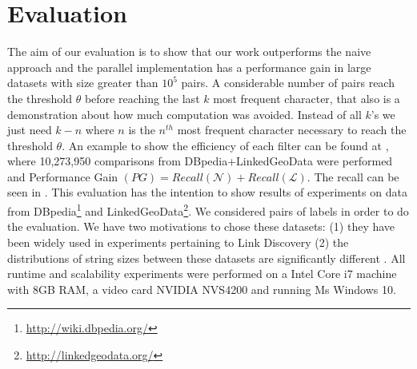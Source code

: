 \section{Evaluation} \label{evaluation}

The aim of our evaluation is to show that our work outperforms the naive approach and the parallel implementation has a performance gain in large datasets with size greater than $10^5$ pairs.
A considerable number of pairs reach the threshold $\theta$ before reaching the last $k$ most frequent character, that also is a demonstration about how much computation was avoided. 
Instead of all $k$'s we just need $k-n$ where $n$ is the $n^{th}$ most frequent character necessary to reach the threshold $\theta$. 
An example to show the efficiency of each filter can be found at , where 10,273,950 comparisons from DBpedia+LinkedGeoData were performed and Performance Gain $(PG)=Recall(\mathcal{N}) + Recall(\mathcal{L})$. 
The recall can be seen in .
This evaluation has the intention to show results of experiments on data from DBpedia\footnote{\url{http://wiki.dbpedia.org/}} and LinkedGeoData\footnote{\url{http://linkedgeodata.org/}}. We considered pairs of labels in order to do the evaluation.
We have two motivations to chose these datasets: (1) they have been widely used in experiments pertaining to Link Discovery (2) the distributions of string sizes between these datasets are significantly different \cite{dressler2014efficient}. 
All runtime and scalability experiments were performed on a Intel Core i7 machine with 8GB RAM, a video card NVIDIA NVS4200 and running Ms Windows 10.


